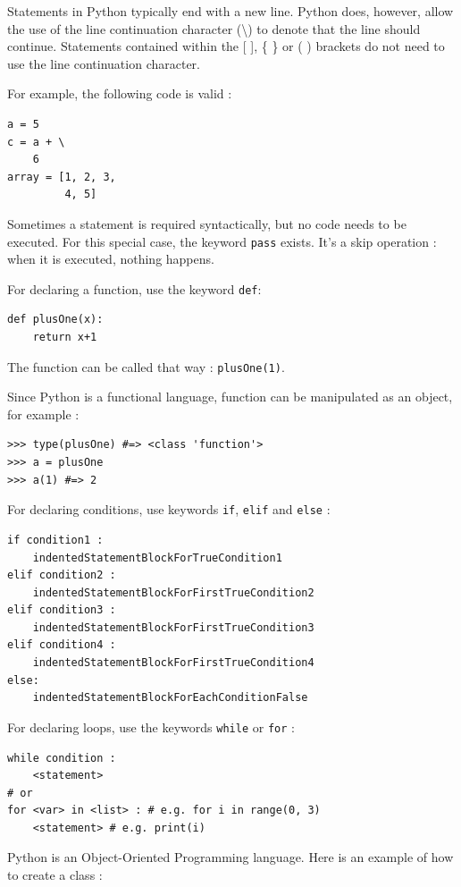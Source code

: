 \documentclass[a4paper,10pt]{article}
\begin{document}
Statements in Python typically end with a new line. Python does, however, allow the use of the line continuation character (\textbackslash) to denote that the line should continue. Statements contained within the [ ], \{ \} or ( ) brackets do not need to use the line continuation character.

For example, the following code is valid :

\begin{lstlisting}
a = 5
c = a + \
    6
array = [1, 2, 3,
         4, 5]
\end{lstlisting}


Sometimes a statement is required syntactically, but no code needs to be executed.
For this special case, the keyword \lstinline|pass| exists.
It’s a skip operation : when it is executed, nothing happens.

For declaring a function, use the keyword \lstinline|def|:

\begin{lstlisting}
def plusOne(x):
    return x+1
\end{lstlisting}

The function can be called that way : \lstinline{plusOne(1)}.

Since Python is a functional language, function can be manipulated as an object, for example :

\begin{lstlisting}
>>> type(plusOne) #=> <class 'function'>
>>> a = plusOne
>>> a(1) #=> 2
\end{lstlisting}

For declaring conditions, use keywords \lstinline|if|, \lstinline|elif| and \lstinline|else| :

\begin{lstlisting}
if condition1 :
    indentedStatementBlockForTrueCondition1
elif condition2 :
    indentedStatementBlockForFirstTrueCondition2
elif condition3 :
    indentedStatementBlockForFirstTrueCondition3
elif condition4 :
    indentedStatementBlockForFirstTrueCondition4
else:
    indentedStatementBlockForEachConditionFalse
\end{lstlisting}

For declaring loops, use the keywords \lstinline|while| or \lstinline|for| :
\begin{lstlisting}
while condition :
    <statement>
# or
for <var> in <list> : # e.g. for i in range(0, 3)
    <statement> # e.g. print(i)
\end{lstlisting}

Python is an Object-Oriented Programming language. Here is an example of how to create a class :
\end{document}
